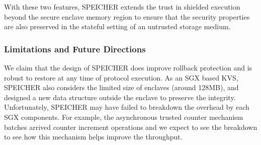 With these two features, SPEICHER extends the trust in shielded execution beyond the secure enclave memory region to ensure that the security properties are also preserved in the stateful setting of an untrusted storage medium.

\subsubsection{Limitations and Future Directions}

We claim that the design of SPEICHER does improve rollback protection and is robust to 
restore at any time of protocol execution. As an SGX based KVS, SPEICHER also considers 
the limited size of enclaves (around 128MB), and designed a new data structure outside 
the enclave to preserve the integrity. Unfortunately, SPEICHER may have failed to breakdown 
the overhead by each SGX components. For example, the asynchronous trusted counter mechanism
batches arrived counter increment operations and we expect to see the breakdown to see how 
this mechanism helps improve the throughput.


